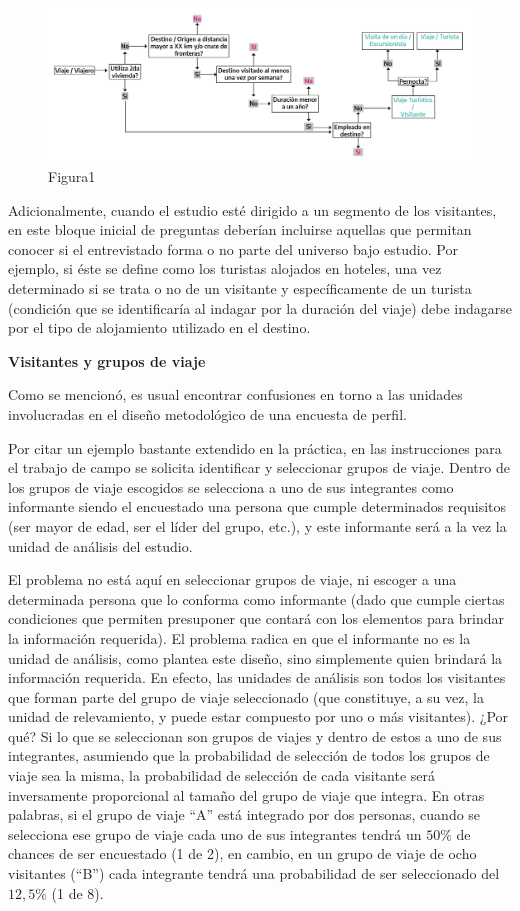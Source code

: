 \documentclass[
]{book}
\begin{document}
\begin{figure}
\includegraphics[width=1\linewidth]{imagenes/figura_1} \caption{Figura1}\label{fig:identificacióndelosvisitantes}
\end{figure}

Adicionalmente, cuando el estudio esté dirigido a un segmento de los visitantes, en este bloque inicial de preguntas deberían incluirse aquellas que permitan conocer si el entrevistado forma o no parte del universo bajo estudio. Por ejemplo, si éste se define como los turistas alojados en hoteles, una vez determinado si se trata o no de un visitante y específicamente de un turista (condición que se identificaría al indagar por la duración del viaje) debe indagarse por el tipo de alojamiento utilizado en el destino.

\textbf{Visitantes y grupos de viaje}

Como se mencionó, es usual encontrar confusiones en torno a las unidades involucradas en el diseño metodológico de una encuesta de perfil.

Por citar un ejemplo bastante extendido en la práctica, en las instrucciones para el trabajo de campo se solicita identificar y seleccionar grupos de viaje. Dentro de los grupos de viaje escogidos se selecciona a uno de sus integrantes como informante siendo el encuestado una persona que cumple determinados requisitos (ser mayor de edad, ser el líder del grupo, etc.), y este informante será a la vez la unidad de análisis del estudio.

El problema no está aquí en seleccionar grupos de viaje, ni escoger a una determinada persona que lo conforma como informante (dado que cumple ciertas condiciones que permiten presuponer que contará con los elementos para brindar la información requerida). El problema radica en que el informante no es la unidad de análisis, como plantea este diseño, sino simplemente quien brindará la información requerida. En efecto, las unidades de análisis son todos los visitantes que forman parte del grupo de viaje seleccionado (que constituye, a su vez, la unidad de relevamiento, y puede estar compuesto por uno o más visitantes). ¿Por qué? Si lo que se seleccionan son grupos de viajes y dentro de estos a uno de sus integrantes, asumiendo que la probabilidad de selección de todos los grupos de viaje sea la misma, la probabilidad de selección de cada visitante será inversamente proporcional al tamaño del grupo de viaje que integra. En otras palabras, si el grupo de viaje ``A'' está integrado por dos personas, cuando se selecciona ese grupo de viaje cada uno de sus integrantes tendrá un \(50\%\) de chances de ser encuestado (1 de 2), en cambio, en un grupo de viaje de ocho visitantes (``B'') cada integrante tendrá una probabilidad de ser seleccionado del \(12,5\%\) (1 de 8).
\end{document}

